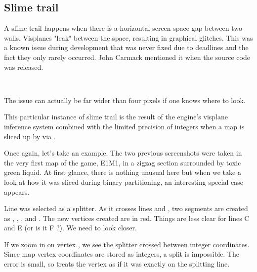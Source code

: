 \subsection{Slime trail}
A slime trail happens when there is a horizontal screen space gap between two walls. Visplanes "leak" between the space, resulting in graphical glitches. This was a known issue during development that was never fixed due to deadlines and the fact they only rarely occurred. John Carmack mentioned it when the  source code was released.\\
\par
{}\\
\par



The issue can actually be far wider than four pixels if one knows where to look.\\
\par
{}
\par
This particular instance of slime trail is the result of the engine's visplane inference system combined with the limited precision of integers when a map is sliced up by via .\\
\par
 Once again, let's take an example. The two previous screenshots were taken in the very first map of the game, E1M1, in a zigzag section surrounded by toxic green liquid. At first glance, there is nothing unusual here but when we take a look at how it was sliced during binary partitioning, an interesting special case appears.\\
\par
Line  was selected as a splitter. As it crosses lines  and , two segments are created as , , , and . The new vertices created are in red. Things are less clear for lines C and E (or is it F ?). We need to look closer. \\
\par
If we zoom in on vertex , we see the splitter crossed  between integer coordinates. Since map vertex coordinates are stored as integers, a split is impossible. The error is small, so  treats the vertex as if it was exactly on the splitting line.

